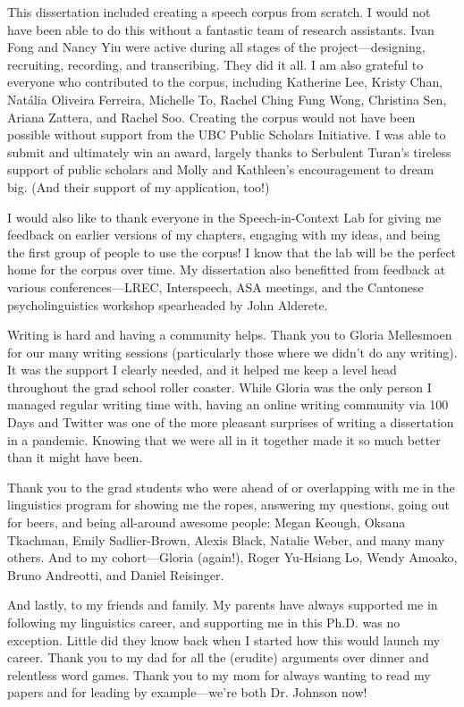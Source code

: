 This dissertation included creating a speech corpus from scratch. I would not have been able to do this without a fantastic team of research assistants. Ivan Fong and Nancy Yiu were active during all stages of the project---designing, recruiting, recording, and transcribing. They did it all. I am also grateful to everyone who contributed to the corpus, including Katherine Lee, Kristy Chan, Natália Oliveira Ferreira, Michelle To, Rachel Ching Fung Wong, Christina Sen, Ariana Zattera, and Rachel Soo. Creating the corpus would not have been possible without support from the UBC Public Scholars Initiative. I was able to submit and ultimately win an award, largely thanks to Serbulent Turan's tireless support of public scholars and Molly and Kathleen's encouragement to dream big. (And their support of my application, too!)

I would also like to thank everyone in the Speech-in-Context Lab for giving me feedback on earlier versions of my chapters, engaging with my ideas, and being the first group of people to use the corpus! I know that the lab will be the perfect home for the corpus over time. My dissertation also benefitted from feedback at various conferences---LREC, Interspeech, ASA meetings, and the Cantonese psycholinguistics workshop spearheaded by John Alderete.

Writing is hard and having a community helps. Thank you to Gloria Mellesmoen for our many writing sessions (particularly those where we didn't do any writing). It was the support I clearly needed, and it helped me keep a level head throughout the grad school roller coaster. While Gloria was the only person I managed regular writing time with, having an online writing community via 100 Days and Twitter was one of the more pleasant surprises of writing a dissertation in a pandemic. Knowing that we were all in it together made it so much better than it might have been.

Thank you to the grad students who were ahead of or overlapping with me in the linguistics program for showing me the ropes, answering my questions, going out for beers, and being all-around awesome people: Megan Keough, Oksana Tkachman, Emily Sadlier-Brown, Alexis Black, Natalie Weber, and many many others. And to my cohort---Gloria (again!), Roger Yu-Hsiang Lo, Wendy Amoako, Bruno Andreotti, and Daniel Reisinger. 

And lastly, to my friends and family. My parents have always supported me in following my linguistics career, and supporting me in this Ph.D. was no exception. Little did they know back when I started how this would launch my career. Thank you to my dad for all the (erudite) arguments over dinner and relentless word games. Thank you to my mom for always wanting to read my papers and for leading by example---we're both Dr. Johnson now! 


